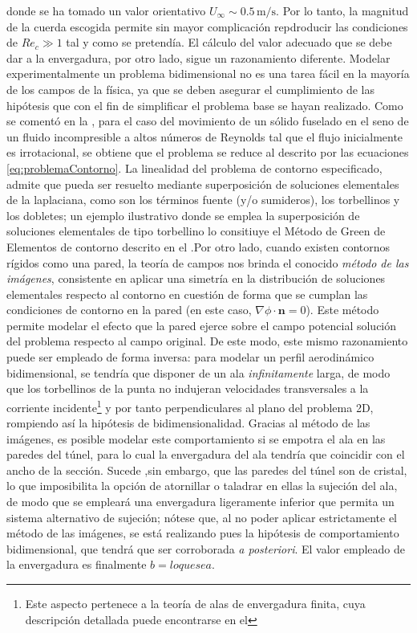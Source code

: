 donde se ha tomado un valor orientativo $U_{\infty} \sim 0.5\,\mathrm{m/s}$. Por lo tanto, la magnitud de la cuerda escogida permite sin mayor complicación repdroducir las condiciones de $Re_{c} \gg 1$ tal y como se pretendía. El cálculo del valor adecuado que se debe dar a la envergadura, por otro lado, sigue un razonamiento diferente. Modelar experimentalmente un problema bidimensional no es una tarea fácil en la mayoría de los campos de la física, ya que se deben asegurar el cumplimiento de las hipótesis que con el fin de simplificar el problema base se hayan realizado. Como se comentó en la , para el caso del movimiento de un sólido fuselado en el seno de un fluido incompresible a altos números de Reynolds tal que el flujo inicialmente es irrotacional, se obtiene que el problema se reduce al descrito por las ecuaciones \eqref{eq:problemaContorno}. La linealidad del problema de contorno especificado, admite que pueda ser resuelto mediante superposición de soluciones elementales de la laplaciana, como son los términos fuente (y/o sumideros), los torbellinos y los dobletes; un ejemplo ilustrativo donde se emplea la superposición de soluciones elementales de tipo torbellino lo consitiuye el Método de Green de Elementos de contorno descrito en el .Por otro lado, cuando existen contornos rígidos como una pared, la teoría de campos nos brinda el conocido \emph{método de las imágenes}, consistente en aplicar una simetría en la distribución de soluciones elementales respecto al contorno en cuestión de forma que se cumplan las condiciones de contorno en la pared (en este caso, $\nabla \phi \cdot \mathbf{n} = 0$). Este método permite modelar el efecto que la pared ejerce sobre el campo potencial solución del problema respecto al campo original. De este modo, este mismo razonamiento puede ser empleado de forma inversa: para modelar un perfil aerodinámico bidimensional, se tendría que disponer de un ala \emph{infinitamente} larga, de modo que los torbellinos de la punta no indujeran velocidades transversales a la corriente incidente\footnote{Este aspecto pertenece a la teoría de alas de envergadura finita, cuya descripción detallada puede encontrarse en el } y por tanto perpendiculares al plano del problema 2D, rompiendo así la hipótesis de bidimensionalidad. Gracias al método de las imágenes, es posible modelar este  comportamiento si se empotra el ala en las paredes del túnel, para lo cual la envergadura del ala tendría que coincidir con el ancho de la sección. Sucede ,sin embargo, que las paredes del túnel son de cristal, lo que imposibilita la opción de atornillar o taladrar en ellas la sujeción del ala, de modo que se empleará una envergadura ligeramente inferior que permita un sistema alternativo de sujeción; nótese que, al no poder aplicar estrictamente el método de las imágenes, se está realizando pues la hipótesis de comportamiento bidimensional, que tendrá que ser corroborada \textit{a posteriori}. El valor empleado de la envergadura es finalmente $b = lo que sea$.

